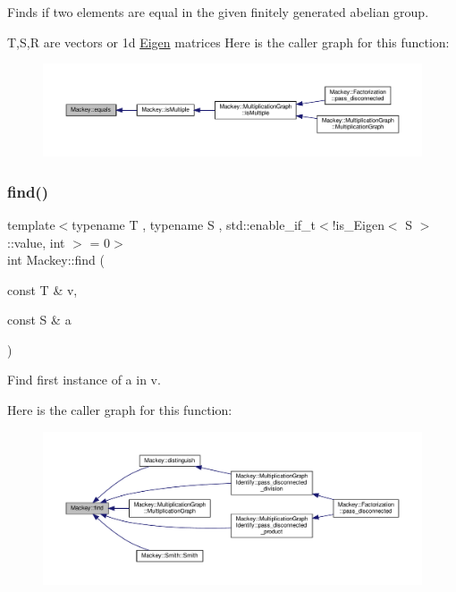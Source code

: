 Finds if two elements are equal in the given finitely generated abelian group. 

T,S,R are vectors or 1d \hyperlink{namespaceEigen}{Eigen} matrices Here is the caller graph for this function\+:\nopagebreak
\begin{figure}[H]
\begin{center}
\leavevmode
\includegraphics[width=350pt]{namespaceMackey_a82dd9e46100ec78b6238a3b60a5b1b45_icgraph}
\end{center}
\end{figure}
\mbox{\label{namespaceMackey_a91104eaef1ab349e68f0623cfaaf45c0}} 
\subsubsection{\texorpdfstring{find()}{find()}}
{\footnotesize\ttfamily template$<$typename T , typename S , std\+::enable\+\_\+if\+\_\+t$<$!is\+\_\+\+Eigen$<$ S $>$\+::value, int $>$  = 0$>$ \\
int Mackey\+::find (\begin{DoxyParamCaption}\item[{const T \&}]{v,  }\item[{const S \&}]{a }\end{DoxyParamCaption})}



Find first instance of a in v. 

Here is the caller graph for this function\+:\nopagebreak
\begin{figure}[H]
\begin{center}
\leavevmode
\includegraphics[width=350pt]{namespaceMackey_a91104eaef1ab349e68f0623cfaaf45c0_icgraph}
\end{center}
\end{figure}
\mbox{\label{namespaceMackey_a2b9319a9af0a3cad8cfec47e9197dc82}} 

